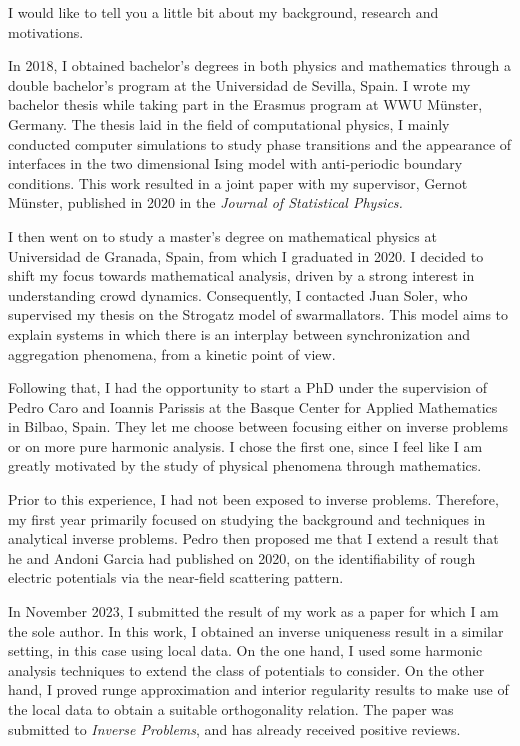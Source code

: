 \documentclass{article}
\begin{document}
I would like to tell you a little bit about my background, research and motivations. 

In 2018, I obtained bachelor's degrees in both physics and mathematics through a double bachelor's program at the Universidad de Sevilla, Spain. I wrote my bachelor thesis while taking part in the Erasmus program at WWU M\"{u}nster, Germany. The thesis laid in the field of computational physics, I mainly conducted computer simulations to study phase transitions and the appearance of interfaces in the two dimensional Ising model with anti-periodic boundary conditions. This work resulted in a joint paper with my supervisor, Gernot M\"unster, published in 2020 in the \textit{Journal of Statistical Physics.}

I then went on to study a master's degree on mathematical physics at Universidad de Granada, Spain, from which I graduated in 2020. I decided to shift my focus towards mathematical analysis, driven by a strong interest in understanding crowd dynamics.  Consequently, I contacted Juan Soler, who supervised my thesis on the Strogatz model of swarmallators. This model aims to explain systems in which there is an interplay between synchronization and aggregation phenomena, from a kinetic point of view.

Following that, I had the opportunity to start a PhD under the supervision of Pedro Caro and Ioannis Parissis at the Basque Center for Applied Mathematics in Bilbao, Spain. They let me choose between focusing either on inverse problems or on more pure harmonic analysis. I chose the first one, since I feel like I am greatly motivated by the study of physical phenomena through mathematics.

Prior to this experience, I had not been exposed to inverse problems. Therefore, my first year primarily focused on studying the background and techniques in analytical inverse problems. Pedro then proposed me that I extend a result that he and Andoni Garcia had published on 2020, on the identifiability of rough electric potentials via the near-field scattering pattern. 

In November 2023, I submitted the result of my work as a paper for which I am the sole author. In this work, I obtained an inverse uniqueness result in a similar setting, in this case using local data. On the one hand, I used some harmonic analysis techniques to extend the class of potentials to consider. On the other hand, I proved runge approximation and interior regularity results to make use of the local data to obtain a suitable orthogonality relation. The paper was submitted to \textit{Inverse Problems}, and has already received positive reviews.
\end{document}
